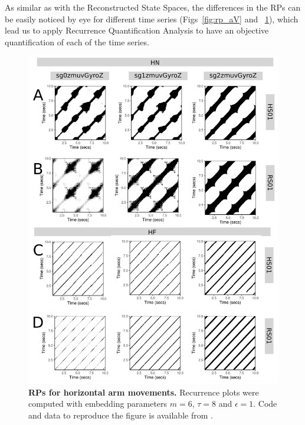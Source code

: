 \documentclass[fleqn,10pt]{wlscirep}
\begin{document}
As similar as with the Reconstructed State Spaces, 
the differences in the RPs can be easily noticed by eye 
for different time series (Figs~\ref{fig:rp_aV} and ~\ref{fig:rp_aH}), 
which lead us to apply Recurrence Quantification Analysis 
to have an objective quantification of each of the time series.
\begin{figure}[ht]
\centering
\includegraphics[width=1.0\textwidth]{figures/rps/pdf/rp_aH}
\caption{
	{\bf RPs for horizontal arm movements.}	
	Recurrence plots were computed with 
	embedding parameters $m=6$, $\tau=8$ and $\epsilon=1$.
	Code and data to reproduce the figure is available from \cite{srep2019}.
        }
    \label{fig:rp_aH}
\end{figure}
\end{document}
